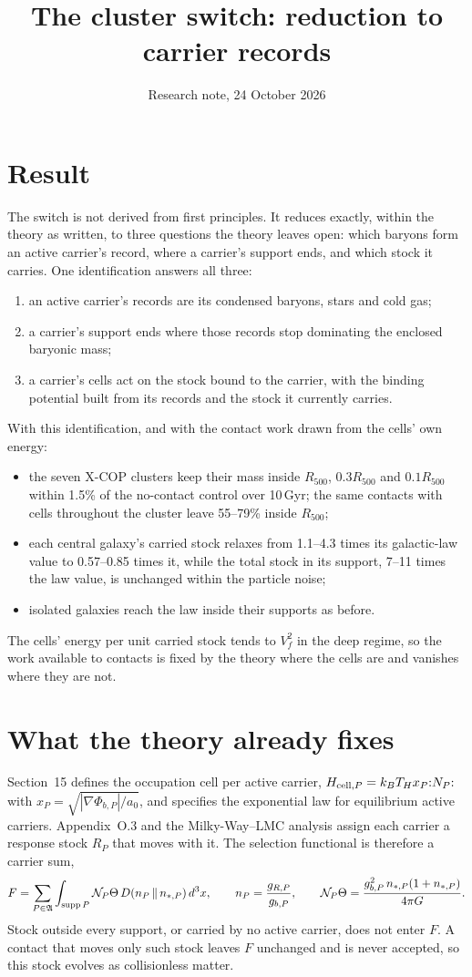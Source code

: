 \documentclass[11pt]{article}
\title{The cluster switch: reduction to carrier records}
\author{Research note, 24 October 2026}
\date{}
\begin{document}
\maketitle

\section{Result}
The switch is not derived from first principles. It reduces exactly, within the theory
as written, to three questions the theory leaves open: which baryons form an active
carrier's record, where a carrier's support ends, and which stock it carries. One
identification answers all three:
\begin{enumerate}
\item an active carrier's records are its condensed baryons, stars and cold gas;
\item a carrier's support ends where those records stop dominating the enclosed baryonic
mass;
\item a carrier's cells act on the stock bound to the carrier, with the binding
potential built from its records and the stock it currently carries.
\end{enumerate}
With this identification, and with the contact work drawn from the cells' own energy:
\begin{itemize}
\item the seven X-COP clusters keep their mass inside $R_{500}$, $0.3R_{500}$ and
$0.1R_{500}$ within 1.5\% of the no-contact control over 10\,Gyr; the same contacts with
cells throughout the cluster leave 55--79\% inside $R_{500}$;
\item each central galaxy's carried stock relaxes from 1.1--4.3 times its galactic-law
value to 0.57--0.85 times it, while the total stock in its support, 7--11 times the law
value, is unchanged within the particle noise;
\item isolated galaxies reach the law inside their supports as before.
\end{itemize}
The cells' energy per unit carried stock tends to $V_f^2$ in the deep regime, so the work
available to contacts is fixed by the theory where the cells are and vanishes where they
are not.

\section{What the theory already fixes}
Section~15 defines the occupation cell per active carrier,
$H_{{\rm cell},P}=k_BT_Hx_P{:}N_P{:}$ with $x_P=\sqrt{|\nabla\Phi_{b,P}|/a_0}$, and
specifies the exponential law for equilibrium active carriers. Appendix~O.3 and the
Milky-Way--LMC analysis assign each carrier a response stock $R_P$ that moves with it.
The selection functional is therefore a carrier sum,
\[
F=\sum_{P\in\mathfrak A}\int_{{\rm supp}\,P}\mathcal N_P\Theta\,
D\!\left(n_P\,\Vert\,n_{*,P}\right)d^3x,\qquad
n_P=\frac{g_{R,P}}{g_{b,P}},\qquad
\mathcal N_P\Theta=\frac{g_{b,P}^2\,n_{*,P}(1+n_{*,P})}{4\pi G}.
\]
Stock outside every support, or carried by no active carrier, does not enter $F$. A
contact that moves only such stock leaves $F$ unchanged and is never accepted, so this
stock evolves as collisionless matter.
\end{document}
